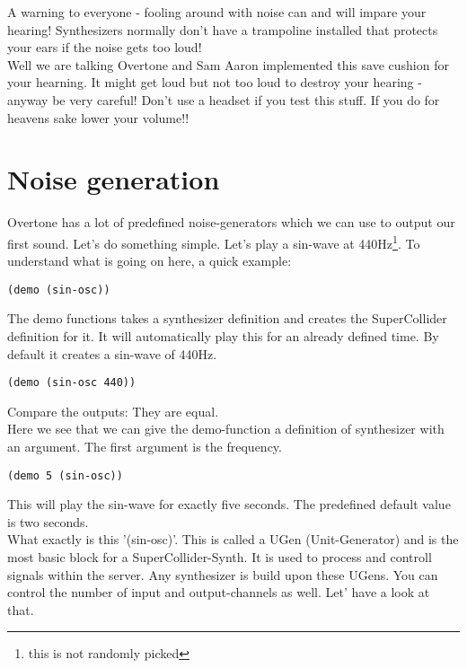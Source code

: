 A warning to everyone - fooling around with noise can and will impare your hearing! Synthesizers normally don't have a trampoline installed that protects your ears if the noise gets too loud!\\
Well we are talking Overtone and Sam Aaron implemented this save cushion for your hearning. It might get loud but not too loud to destroy your hearing - anyway be very careful! Don't use a headset if you test this stuff. If you do for heavens sake lower your volume!!  

\section{Noise generation}
Overtone has a lot of predefined noise-generators which we can use to output our first sound. Let's do something simple. Let's play a sin-wave at 440Hz\footnote{this is not randomly picked}. 
To understand what is going on here, a quick example:

\begin{lstlisting}
(demo (sin-osc))
\end{lstlisting}

The demo functions takes a synthesizer definition and creates the SuperCollider definition for it. It will automatically play this for an already defined time. By default it creates a sin-wave of 440Hz.

\begin{lstlisting}
(demo (sin-osc 440))
\end{lstlisting}

Compare the outputs: They are equal.\\
Here we see that we can give the demo-function a definition of synthesizer with an argument. The first argument is the frequency.

\begin{lstlisting}
(demo 5 (sin-osc))
\end{lstlisting}

This will play the sin-wave for exactly five seconds. The predefined default value is two seconds.\\

What exactly is this '(sin-osc)'. This is called a \gls{UGen} (Unit-Generator) and is the most basic block for a SuperCollider-Synth. It is used to process and controll signals within the server. Any synthesizer is build upon these UGens. You can control the number of input and output-channels as well. Let' have a look at that.

